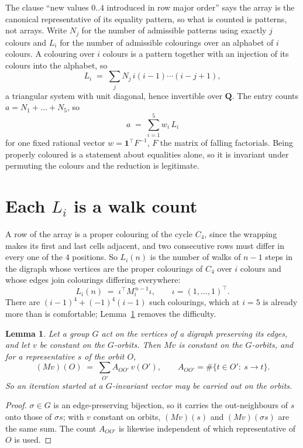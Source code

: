 \documentclass[11pt,a4paper]{article}
\theoremstyle{plain}
\newtheorem{lemma}[theorem]{Lemma}
\theoremstyle{definition}
\begin{document}
The clause ``new values $0..4$ introduced in row major order'' says the array is the
canonical representative of its equality pattern, so what is counted is patterns, not arrays.
Write $N_j$ for the number of admissible patterns using exactly $j$ colours and $L_i$ for the
number of admissible colourings over an alphabet of $i$ colours. A colouring over $i$ colours
is a pattern together with an injection of its colours into the alphabet, so
\[
L_i\;=\;\sum_j N_j\,i(i-1)\cdots(i-j+1),
\]
a triangular system with unit diagonal, hence invertible over $\mathbf{Q}$. The entry counts
$a=N_1+\dots+N_{5}$, so
\[
a\;=\;\sum_{i=1}^{5}w_i\,L_i
\]
for one fixed rational vector $w=\mathbf{1}^{\!\top}F^{-1}$, $F$ the matrix of falling
factorials. Being properly coloured is a statement about equalities alone, so it is invariant
under permuting the colours and the reduction is legitimate.

\section{Each $L_i$ is a walk count}

A row of the array is a proper colouring of the cycle $C_{4}$, since the wrapping makes
its first and last cells adjacent, and two consecutive rows must differ in every one of the
$4$ positions. So $L_i(n)$ is the number of walks of $n-1$ steps in the digraph whose
vertices are the proper colourings of $C_{4}$ over $i$ colours and whose edges join
colourings differing everywhere:
\[
L_i(n)\;=\;\iota^{\!\top}M_i^{\,n-1}\iota ,\qquad \iota=(1,\dots,1)^{\!\top} .
\]
There are $(i-1)^{4}+(-1)^{4}(i-1)$ such colourings, which at $i=5$ is already more
than is comfortable; Lemma~\ref{lem:lump} removes the difficulty.

\begin{lemma}\label{lem:lump}
Let a group $G$ act on the vertices of a digraph preserving its edges, and let $v$ be constant
on the $G$-orbits. Then $Mv$ is constant on the $G$-orbits, and for a representative $s$ of
the orbit $O$,
\[
(Mv)(O)\;=\;\sum_{O'}A_{OO'}\,v(O'),\qquad
A_{OO'}=\#\{t\in O':\ s\to t\} .
\]
So an iteration started at a $G$-invariant vector may be carried out on the orbits.
\end{lemma}

\begin{proof}
$\sigma\in G$ is an edge-preserving bijection, so it carries the out-neighbours of $s$ onto
those of $\sigma s$; with $v$ constant on orbits, $(Mv)(s)$ and $(Mv)(\sigma s)$ are the same
sum. The count $A_{OO'}$ is likewise independent of which representative of $O$ is used.
\end{proof}
\end{document}
